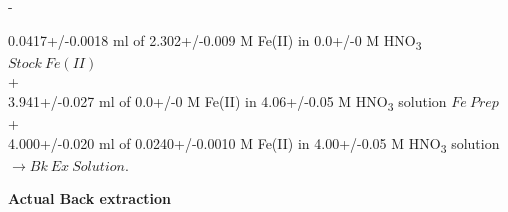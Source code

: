 \documentclass[idxtotoc,hyperref,openany,oneside]{labbook} %
\newcommand{\cmark}{\ding{51}}%
\newcommand{\done}{\rlap{$\square$}{\raisebox{2pt}{\large\hspace{1pt}\cmark}}%
  \hspace{-2.5pt}}
\newcommand{\tsbs}{\textsubscript}
\begin{document}
\begin{todolist}
\item[\done]{-}
\end{todolist}
\begin{center}
0.0417+/-0.0018 ml of 2.302+/-0.009 M Fe(II) in 0.0+/-0 M HNO\tsbs{3} $\boxed{Stock\ Fe(II)}$\\
+\\
3.941+/-0.027 ml of 0.0+/-0 M Fe(II) in 4.06+/-0.05 M HNO\tsbs{3} solution $\boxed{Fe\ Prep}$\\
+\\
4.000+/-0.020 ml of 0.0240+/-0.0010 M Fe(II) in 4.00+/-0.05 M HNO\tsbs{3} solution $\boxed{\rightarrow Bk\ Ex\ Solution}$.
\end{center}

\textbf{Actual Back extraction}
\end{document}
